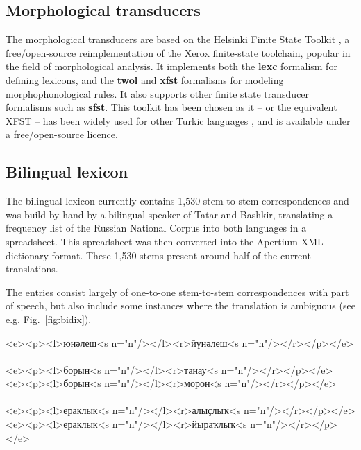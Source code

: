 \documentclass[11pt,a4paper]{article}
\begin{document}
\subsection{Morphological transducers}

The morphological transducers are based on the Helsinki Finite State Toolkit \cite{hfst/2011}, a 
free/open-source reimplementation of the Xerox finite-state toolchain, popular in the field of 
morphological analysis. It implements both the \textbf{lexc} formalism for defining lexicons, 
and the \textbf{twol} and \textbf{xfst} formalisms for modeling morphophonological rules. It 
also supports other finite state transducer formalisms such as \textbf{sfst}. This toolkit has 
been chosen as it -- or the equivalent XFST -- has been widely used for 
other Turkic languages \cite{coltekin2010,altintas2001,tantug2006}, 
and is available under a free/open-source licence.

\subsection{Bilingual lexicon}

The bilingual lexicon currently contains 1,530 stem to stem correspondences and was build by hand by a bilingual 
speaker of Tatar and Bashkir, translating a frequency list of the Russian National Corpus \cite{rnc} 
into both languages in a spreadsheet. This spreadsheet was then converted into the Apertium
XML dictionary format. These 1,530 stems present around half of the current translations.

The entries consist largely of one-to-one stem-to-stem correspondences with part of speech, but also
include some instances where the translation is ambiguous (see e.g. Fig.~\ref{fig:bidix}).

\begin{figure*}
\begin{center}
\begin{texttt}
    <e><p><l>юнәлеш<s n="n"/></l><r>йүнәлеш<s n="n"/></r></p></e> \\
~\\
    <e><p><l>борын<s n="n"/></l><r>танау<s n="n"/></r></p></e> \\
    <e><p><l>борын<s n="n"/></l><r>морон<s n="n"/></r></p></e> \\
~\\
    <e><p><l>ераклык<s n="n"/></l><r>алыҫлыҡ<s n="n"/></r></p></e> \\
    <e><p><l>ераклык<s n="n"/></l><r>йыраҡлыҡ<s n="n"/></r></p></e>

\end{texttt}
\end{center}
\caption{Example entries from the bilingual transfer lexicon}
\label{fig:bidix}
\end{figure*}
\end{document}
